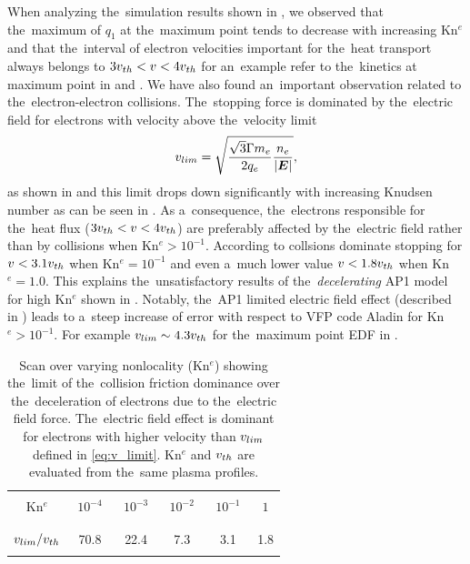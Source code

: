 When analyzing the~simulation results shown in , 
we observed that 
the~maximum of $q_1$ at the~maximum point tends to decrease with increasing 
Kn$^e$ and that the~interval of electron velocities important for 
the~heat transport always belongs to $3 v_{th} < v <4 v_{th}$ for an~example
refer to the~kinetics at maximum point in  
and . 
We have also found 
an~important observation related to the~electron-electron collisions.
The~stopping force is dominated by
the~electric field for electrons with velocity above the~velocity limit
\begin{equation}
  v_{lim} = \sqrt{\frac{\sqrt{3}\Gamma m_e}{2q_e}\frac{n_e}{|\boldsymbol{E}|}}
  ,
  \label{eq:v_limit}
\end{equation}
as shown in  and this limit drops 
down significantly with increasing Knudsen number as can be seen 
in . 
As a~consequence, the~electrons responsible for the~heat flux
($3 v_{th} < v <4 v_{th}$) are preferably affected by the~electric field
rather than by collisions when Kn$^{e} > 10^{-1}$. According to 
 collsions dominate stopping for $v < 3.1 v_{th}$ 
when Kn$^e = 10^{-1}$ and even a~much lower value $v < 1.8 v_{th}$ 
when Kn$^e = 1.0$. This explains the~unsatisfactory results of 
the~\textit{decelerating} AP1
model for high Kn$^e$ shown in . 
Notably, the~AP1 limited electric field effect (described in 
) leads to a~steep increase of error with respect 
to VFP code Aladin for Kn$^e > 10^{-1}$. 
For example $v_{lim}\sim 4.3v_{th}$ for the~maximum point EDF in 
.

\begin{table}
\begin{center}
  \begin{tabular}{c|ccccc}
    \hline\hline\\
    Kn$^e$ & $\,\,10^{-4}\,\,$ & $\,\,10^{-3}\,\,$ & $\,\,10^{-2}\,\,$ & $\,\,10^{-1}\,\,$ & $\,\,1\,\,$ \\\\
    \hline\\
    $v_{lim} / v_{th}$ & 70.8 & 22.4 & 7.3 & 3.1 & 1.8\\\\
    \hline\hline
  \end{tabular}
  \caption{
  Scan over varying nonlocality (Kn$^e$) showing the~limit of 
  the~collision friction dominance over the~deceleration of electrons 
  due to the~electric field force. The~electric field effect is dominant
  for electrons with higher velocity than $v_{lim}$ defined in 
  \eqref{eq:v_limit}. Kn$^e$ and $v_{th}$ are evaluated from the~same 
  plasma profiles.
  }
\label{tab:vlim}
\end{center}
\end{table}

